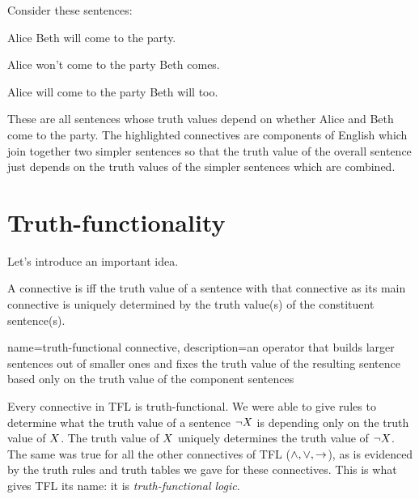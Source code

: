Consider these sentences:
\begin{compactlist}
	\item {} Alice  Beth will come to the party.  
	\item Alice won't come to the party  Beth comes. 
	\item Alice will come to the party  Beth will too.
\end{compactlist}

These are all sentences whose truth values depend on whether Alice and Beth come to the party. The highlighted connectives are components of English which join together two simpler sentences so that the truth value of the overall sentence just depends on the truth values of the simpler sentences which are combined. 



\section{Truth-functionality}
Let's introduce an important idea.
\begin{definition}
	A connective is  iff the truth value of a sentence with that connective as its main connective is uniquely determined by the truth value(s) of the constituent sentence(s).
\end{definition}
{
	name=truth-functional connective,
	description={an operator that builds larger sentences out of smaller ones and fixes the \gls{truth value} of the resulting sentence based only on the truth value of the component sentences}
}

Every connective in TFL is truth-functional. We were able to give rules to determine what the truth value of a sentence $\neg X$ is depending only on the truth value of $X$. The truth value of $X$ uniquely determines the truth value of $\neg X$. The same was true for all the other connectives of TFL ($\mathbin{\wedge},\vee,\rightarrow$), as is evidenced by the truth rules and truth tables we gave for these connectives. This is what gives TFL its name: it is \emph{truth-functional logic}.

